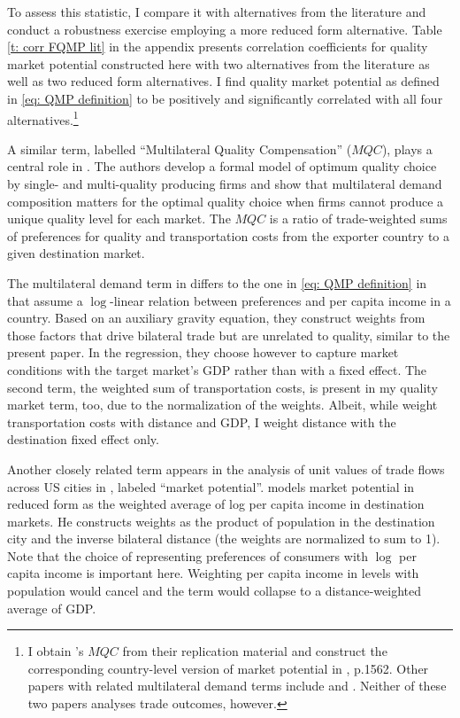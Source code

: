 \documentclass[12pt,a4paper,oneside,times]{article}   	%
\begin{document}
To assess this statistic, I compare it with alternatives from the literature and conduct a robustness exercise employing a more reduced form alternative. Table \ref{t: corr FQMP lit} in the appendix presents correlation coefficients for quality market potential constructed here with two alternatives from the literature as well as two reduced form alternatives. I find quality market potential as defined in \eqref{eq: QMP definition} to be positively and significantly correlated with all four alternatives.\footnote{I obtain \citeauthor{Lugovskyy2015}'s $MQC$ from their replication material and construct the corresponding country-level version of market potential in \cite{Dingel2017}, p.1562. Other papers with related multilateral demand terms include \cite{Breinlich2013} and \cite{Liu2019}. Neither of these two papers analyses trade outcomes, however.}


A similar term, labelled ``Multilateral Quality Compensation'' ($MQC$), plays a central role in \cite{Lugovskyy2015}. The authors develop a formal model of optimum quality choice by single- and multi-quality producing firms and show that multilateral demand composition matters for the optimal quality choice when firms cannot produce a unique quality level for each market.  The $MQC$ is a ratio of trade-weighted sums of preferences for quality and transportation costs from the exporter country to a given destination market. 

The multilateral demand term in \cite{Lugovskyy2015} differs to the one in \eqref{eq: QMP definition} in that \citeauthor{Lugovskyy2015} assume a $\log$-linear relation between preferences and per capita income in a country. Based on an auxiliary gravity equation, they construct weights from those factors that drive bilateral trade but are unrelated to quality, similar to the present paper. In the regression, they choose however to capture market conditions with the target market's GDP rather than with a fixed effect. The second term, the weighted sum of transportation costs, is present in my quality market term, too, due to the normalization of the weights. Albeit, while \cite{Lugovskyy2015} weight transportation costs with distance and GDP, I weight distance with the destination fixed effect only. 

Another closely related term appears in the analysis of unit values of trade flows across US cities in \cite{Dingel2017}, labeled ``market potential''. \citeauthor{Dingel2017} models market potential in reduced form as the weighted average of log per capita income in destination markets. He constructs weights as the product of population in the destination city and the inverse bilateral distance (the weights are normalized to sum to 1). Note that the choice of representing preferences of consumers with $\log$ per capita income is important here. Weighting per capita income in levels with population would cancel and the term would collapse to a distance-weighted average of GDP. 
\end{document}
